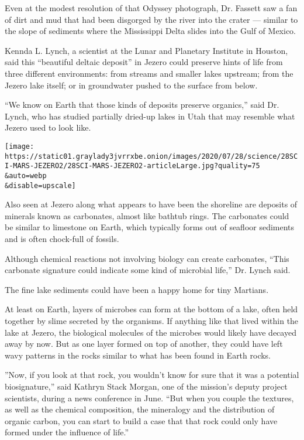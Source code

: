Even at the modest resolution of that Odyssey photograph, Dr. Fassett
saw a fan of dirt and mud that had been disgorged by the river into the
crater --- similar to the slope of sediments where the Mississippi Delta
slides into the Gulf of Mexico.

Kennda L. Lynch, a scientist at the Lunar and Planetary Institute in
Houston, said this ``beautiful deltaic deposit'' in Jezero could
preserve hints of life from three different environments: from streams
and smaller lakes upstream; from the Jezero lake itself; or in
groundwater pushed to the surface from below.

``We know on Earth that those kinds of deposits preserve organics,''
said Dr. Lynch, who has studied partially dried-up lakes in Utah that
may resemble what Jezero used to look like.

\texttt{[image: https://static01.graylady3jvrrxbe.onion/images/2020/07/28/science/28SCI-MARS-JEZERO2/28SCI-MARS-JEZERO2-articleLarge.jpg?quality=75\\\&auto=webp\\\&disable=upscale]}

Also seen at Jezero along what appears to have been the shoreline are
deposits of minerals known as carbonates, almost like bathtub rings. The
carbonates could be similar to limestone on Earth, which typically forms
out of seafloor sediments and is often chock-full of fossils.

Although chemical reactions not involving biology can create carbonates,
``This carbonate signature could indicate some kind of microbial life,''
Dr. Lynch said.

The fine lake sediments could have been a happy home for tiny Martians.

At least on Earth, layers of microbes can form at the bottom of a lake,
often held together by slime secreted by the organisms. If anything like
that lived within the lake at Jezero, the biological molecules of the
microbes would likely have decayed away by now. But as one layer formed
on top of another, they could have left wavy patterns in the rocks
similar to what has been found in Earth rocks.

''Now, if you look at that rock, you wouldn't know for sure that it was
a potential biosignature,'' said Kathryn Stack Morgan, one of the
mission's deputy project scientists, during a news conference in June.
``But when you couple the textures, as well as the chemical composition,
the mineralogy and the distribution of organic carbon, you can start to
build a case that that rock could only have formed under the influence
of life.''

